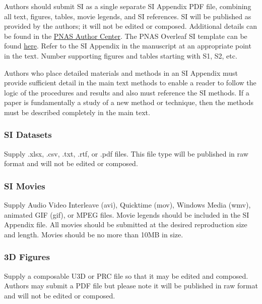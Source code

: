 \documentclass[9pt,twocolumn,twoside,lineno]{pnas-new}
\begin{document}
Authors should submit SI as a single separate SI Appendix PDF file, combining all text, figures, tables, movie legends, and SI references. SI will be published as provided by the authors; it will not be edited or composed. Additional details can be found in the \href{https://www.pnas.org/authors/submitting-your-manuscript#manuscript-formatting-guidelines}{PNAS Author Center}. The PNAS Overleaf SI template can be found \href{https://www.overleaf.com/latex/templates/pnas-template-for-supplementary-information/wqfsfqwyjtsd}{here}. Refer to the SI Appendix in the manuscript at an appropriate point in the text. Number supporting figures and tables starting with S1, S2, etc.

Authors who place detailed materials and methods in an SI Appendix must provide sufficient detail in the main text methods to enable a reader to follow the logic of the procedures and results and also must reference the SI methods. If a paper is fundamentally a study of a new method or technique, then the methods must be described completely in the main text.

\subsubsection*{SI Datasets}

Supply .xlsx, .csv, .txt, .rtf, or .pdf files. This file type will be published in raw format and will not be edited or composed.


\subsubsection*{SI Movies}

Supply Audio Video Interleave (avi), Quicktime (mov), Windows Media (wmv), animated GIF (gif), or MPEG files. Movie legends should be included in the SI Appendix file. All movies should be submitted at the desired reproduction size and length. Movies should be no more than 10MB in size.


\subsubsection*{3D Figures}

Supply a composable U3D or PRC file so that it may be edited and composed. Authors may submit a PDF file but please note it will be published in raw format and will not be edited or composed.


\end{document}
